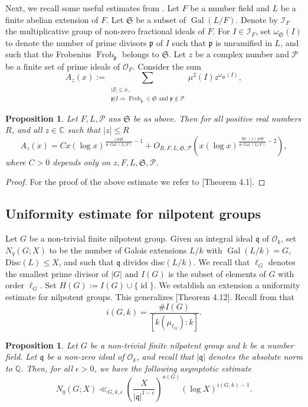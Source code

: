 \documentclass[11pt]{amsart}
\newtheorem{proposition}[theorem]{Proposition}
\newcommand{\fq}{\mathfrak{q}}
\newcommand{\p}{\mathfrak{p}}
\newcommand{\Q}{\mathbb{Q}}
\newcommand{\cO}{\mathcal{O}}
\newcommand{\disc}{\mathrm{Disc}}
\newcommand{\rdisc}{\mathrm{disc}}
\newcommand{\op}[1]{\operatorname{#1}}
\numberwithin{equation}{section}
\begin{document}
 Next, we recall some useful estimates from \cite[section 4]{koymanspagano2023}. Let $F$ be a number field and $L$ be a finite abelian extension of $F$. Let $\mathfrak{S}$ be a subset of $\op{Gal}(L/F)$. Denote by $\mathcal{I}_F$ the multiplicative group of non-zero fractional ideals of $F$. For $I\in \mathcal{I}_F$, set $\omega_{\mathfrak{S}}(I)$ to denote the number of prime divisors $\p$ of $I$ such that $\p$ is unramified in $L$, and such that the Frobenius $\op{Frob}_{\p}$ belongs to $\mathfrak{S}$. Let $z$ be a complex number and $\mathcal{P}$ be a finite set of prime ideals of $\cO_F$. Consider the sum
\[A_z(x):=\sum_{\substack{|I|\leq x,\\ \p|I \Rightarrow \op{Frob}_{\p}\in \mathfrak{S}\text{ and }\p\notin \mathcal{P}}} \mu^2(I) z^{\omega_{\mathfrak{S}}(I)},\]

\begin{proposition}\label{}
    Let $F,L,\mathcal{P}$ ans $\mathfrak{S}$ be as above. Then for all positive real numbers $R$, and all $z\in \mathbb{C}$ such that $|z|\leq R$
\begin{equation}\label{koymans-pagano-4.1}
   A_z(x)= C x (\log x)^{\frac{z\#\mathfrak{S}}{\#\op{Gal}(L/F)}-1} + O_{R,F,L,\mathfrak{S},\mathcal{P}}\left(x (\log x)^{\frac{\op{Re}(z)\#\mathfrak{S}}{\#\op{Gal}(L/F)}-2}\right), 
\end{equation}
where $C > 0$ depends only on $z, F, L, \mathfrak{S}, \mathcal{P}$.
\end{proposition}
\begin{proof}
     For the proof of the above estimate we refer to \cite{koymanspagano2023}[Theorem 4.1].
\end{proof}


\subsection{Uniformity estimate for nilpotent groups}
\par Let $G$ be a  non-trivial finite nilpotent group. Given an integral ideal $\fq$ of $\cO_k$, set $N_q(G;X)$ to be the number of Galois extensions $L/k$ with $\op{Gal}(L/k)= G$, $\disc(L)\leq X$, and such that $\fq$ divides $\rdisc(L/k)$. We recall that $\ell_G$ denotes the smallest prime divisor of $|G|$ and $I(G)$ is the subset of elements of $G$ with order $\ell_G$. Set $H(G):= I(G) \cup \{\op{id}\}$. We establish an extension a uniformity estimate for nilpotent groups. This generalizes \cite{Wang2020}[Theorem 4.12]. Recall from \cite{koymanspagano2023} that \[i(G, k) = \frac{\#I(G)}{[k(\mu_{\ell_G}):k]}.\]
\begin{proposition}\label{loc-uni-est}
    Let $G$ be a non-trivial finite nilpotent group and $k$ be a number field. Let $\fq$ be a non-zero ideal of $\cO_k$, and recall that $|\fq|$ denotes the absolute norm to $\Q$. Then, for all $\epsilon>0$, we have the following asymptotic estimate
    \[
    N_q(G;X) \ll_{G,k,\epsilon} \left(\frac{X}{|\fq|^{1-\epsilon}}\right)^{a(G)}(\log X)^{i(G,k)-1}.
    \]
    
\end{proposition}
\end{document}
